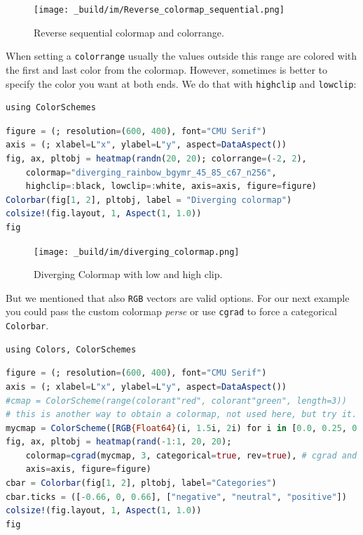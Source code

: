\documentclass[
  notoc %
]{tufte-book}
\newcommand{\passthrough}[1]{#1}
\begin{document}
\begin{figure}
\hypertarget{fig:Reverse_colormap_sequential}{%
\centering
\texttt{[image: \_build/im/Reverse\_colormap\_sequential.png]}
\caption{Reverse sequential colormap and
colorrange.}\label{fig:Reverse_colormap_sequential}
}
\end{figure}

When setting a \passthrough{\lstinline!colorrange!} usually the values
outside this range are colored with the first and last color from the
colormap. However, sometimes is better to specify the color you want at
both ends. We do that with \passthrough{\lstinline!highclip!} and
\passthrough{\lstinline!lowclip!}:

\begin{lstlisting}
using ColorSchemes
\end{lstlisting}

\begin{lstlisting}[language=Julia]
figure = (; resolution=(600, 400), font="CMU Serif")
axis = (; xlabel=L"x", ylabel=L"y", aspect=DataAspect())
fig, ax, pltobj = heatmap(randn(20, 20); colorrange=(-2, 2),
    colormap="diverging_rainbow_bgymr_45_85_c67_n256",
    highclip=:black, lowclip=:white, axis=axis, figure=figure)
Colorbar(fig[1, 2], pltobj, label = "Diverging colormap")
colsize!(fig.layout, 1, Aspect(1, 1.0))
fig
\end{lstlisting}

\begin{figure}
\hypertarget{fig:diverging_colormap}{%
\centering
\texttt{[image: \_build/im/diverging\_colormap.png]}
\caption{Diverging Colormap with low and high
clip.}\label{fig:diverging_colormap}
}
\end{figure}

But we mentioned that also \passthrough{\lstinline!RGB!} vectors are
valid options. For our next example you could pass the custom colormap
\emph{perse} or use \passthrough{\lstinline!cgrad!} to force a
categorical \passthrough{\lstinline!Colorbar!}.

\begin{lstlisting}
using Colors, ColorSchemes
\end{lstlisting}

\begin{lstlisting}[language=Julia]
figure = (; resolution=(600, 400), font="CMU Serif")
axis = (; xlabel=L"x", ylabel=L"y", aspect=DataAspect())
#cmap = ColorScheme(range(colorant"red", colorant"green", length=3))
# this is another way to obtain a colormap, not used here, but try it.
mycmap = ColorScheme([RGB{Float64}(i, 1.5i, 2i) for i in [0.0, 0.25, 0.35, 0.5]])
fig, ax, pltobj = heatmap(rand(-1:1, 20, 20);
    colormap=cgrad(mycmap, 3, categorical=true, rev=true), # cgrad and Symbol, mycmap
    axis=axis, figure=figure)
cbar = Colorbar(fig[1, 2], pltobj, label="Categories")
cbar.ticks = ([-0.66, 0, 0.66], ["negative", "neutral", "positive"])
colsize!(fig.layout, 1, Aspect(1, 1.0))
fig
\end{lstlisting}
\end{document}
